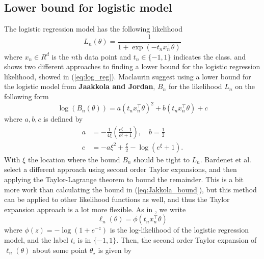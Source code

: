 \subsection{Lower bound for logistic model}
The logistic regression model has the following likelihood 
\begin{equation}\label{eq:log_reg}
    L_n\left(\theta\right) = \frac{1}{1 + \exp\left(-t_n x_n^{\top}\theta \right)} 
\end{equation}
where $x_n \in R^d$ is the $n$th data point and $t_n\in \{-1, 1\}$ indicates the class. 
\cite{Maclaurin:1} and \cite{Bardenet:1} shows two different approaches to finding a lower bound for the logistic regression likelihood, showed in (\ref{eq:log_reg}). 
Maclaurin suggest using a lower bound for the logistic model from \textbf{Jaakkola and Jordan},  $B_n$ for the likelihood $L_n$ on the following form 
\begin{equation}\label{eq:Jakkola_bound}
    \log\left(B_n\left(\theta\right)\right) = a\left(t_n x_n^{\top} \theta\right)^2 + b\left(t_n x_n ^{\top}\theta \right) + c
\end{equation}
where $a,b,c$ is defined by
\begin{equation}
\begin{split}
    a &= -\frac{1}{4\xi}\left(\frac{e^{\xi} - 1}{e^{\xi} + 1}\right), \quad b = \frac{1}{2} \\
    c &= -a\xi^2 + \frac{\xi}{2} - \log\left(e^{\xi} + 1\right). 
\end{split}
\end{equation}
With $\xi$ the location where the bound $B_n$ should be tight to $L_n$. 
Bardenet et al. select a different approach using second order Taylor expansions, and then applying the Taylor-Lagrange theorem to bound the remainder. 
This is a bit more work than calculating the bound in  (\ref{eq:Jakkola_bound}), but this method can be applied to other likelihood functions as well, and thus the Taylor expansion approach is a lot more flexible. As in \cite{Bardenet:1}, we write
\begin{equation}\label{eq:logist_log_likelihood}
\ell_n(\theta) = \phi\left(t_n x_n^{\top}\theta \right)
\end{equation}
where $\phi(z) = -\log\left( 1  + e^{-z}\right)$ is the log-likelihood of the logistic regression model, and the label $t_i$ is in $\{-1, 1\}$. Then, the second order Taylor expansion of $\ell_n\left(\theta\right)$ about some point $\theta_{\star}$ is given by
